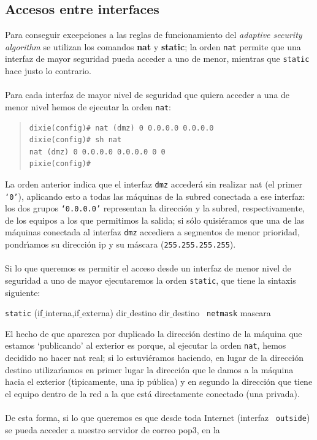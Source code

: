 \subsection{Accesos entre interfaces}
Para conseguir excepciones a las reglas de funcionamiento del {\it adaptive 
security algorithm} se utilizan los comandos {\bf nat} y {\bf static}; la 
orden {\tt nat} permite que una interfaz de mayor seguridad pueda acceder a uno 
de menor, mientras que {\tt static} hace justo lo contrario.\\
\\Para cada interfaz de mayor nivel de seguridad que quiera acceder a una de
menor nivel hemos de ejecutar la orden {\tt nat}:
\begin{quote}
\begin{verbatim}
dixie(config)# nat (dmz) 0 0.0.0.0 0.0.0.0
dixie(config)# sh nat
nat (dmz) 0 0.0.0.0 0.0.0.0 0 0
pixie(config)# 
\end{verbatim}
\end{quote}
La orden anterior indica que el interfaz {\tt dmz} acceder\'a sin realizar
{\sc nat} (el primer {\tt `0'}), aplicando esto a todas las m\'aquinas de la
subred conectada a ese interfaz: los dos grupos {\tt `0.0.0.0'} representan la
direcci\'on y la subred, respectivamente, de los equipos a los que permitimos
la salida; si s\'olo quisi\'eramos que una de las m\'aquinas conectada al
interfaz {\tt dmz} accediera a segmentos de menor prioridad, pondr\'{\i}amos
su direcci\'on {\sc ip} y su m\'ascara ({\tt 255.255.255.255}).\\
\\Si lo que queremos es permitir el acceso desde un interfaz de menor nivel de
seguridad a uno de mayor ejecutaremos la orden {\tt static}, que tiene la 
sintaxis siguiente:
\begin{center}
{\tt static} (if$\_$interna,if$\_$externa) dir$\_$destino dir$\_$destino {\tt 
netmask} mascara
\end{center}
El hecho de que aparezca por duplicado la direcci\'on destino de la m\'aquina
que estamos `publicando' al exterior es porque, al ejecutar la orden {\tt nat},
hemos decidido no hacer {\sc nat} real; si lo estuvi\'eramos haciendo, en lugar
de la direcci\'on destino utilizar\'{\i}amos en primer lugar la direcci\'on
que le damos a la m\'aquina hacia el exterior (t\'{\i}picamente, una {\sc ip}
p\'ublica) y en segundo la direcci\'on que tiene el equipo dentro de la red a
la que est\'a directamente conectado (una privada).\\
\\De esta forma, si lo que queremos es que desde toda Internet (interfaz {\tt
outside}) se pueda acceder a nuestro servidor de correo {\sc pop3}, en la 
